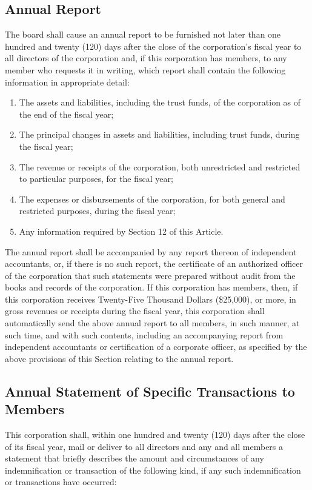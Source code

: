 \documentclass{article}
\begin{document}
	\subsection{Annual Report}
	The board shall cause an annual report to be furnished not later than one hundred and twenty (120) days after the close of the corporation’s fiscal year to all directors of the corporation and, if this corporation has members, to any member who requests it in writing, which report shall contain the following information in appropriate detail:
	\begin{enumerate}[\indent (a)]
		\item The assets and liabilities, including the trust funds, of the corporation as of the end of the fiscal year;
		\item The principal changes in assets and liabilities, including trust funds, during the fiscal year;
		\item The revenue or receipts of the corporation, both unrestricted and restricted to particular purposes, for the fiscal year;
		\item The expenses or disbursements of the corporation, for both general and restricted purposes, during the fiscal year;
		\item Any information required by Section 12 of this Article.
	\end{enumerate}
	The annual report shall be accompanied by any report thereon of independent accountants, or, if there is no such report, the certificate of an authorized officer of the corporation that such statements were prepared without audit from the books and records of the corporation.
	If this corporation has members, then, if this corporation receives Twenty-Five Thousand Dollars (\$25,000), or more, in gross revenues or receipts during the fiscal year, this corporation shall automatically send the above annual report to all members, in such manner, at such time, and with such contents, including an accompanying report from independent accountants or certification of a corporate officer, as specified by the above provisions of this Section relating to the annual report.
	\subsection{Annual Statement of Specific Transactions to Members}
	This corporation shall, within one hundred and twenty (120) days after the close of its fiscal year, mail or deliver to all directors and any and all members a statement that briefly describes the amount and circumstances of any indemnification or transaction of the following kind, if any such indemnification or transactions have occurred:
	
\end{document}
